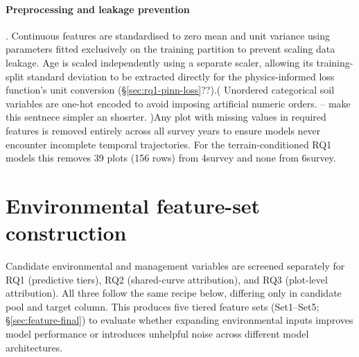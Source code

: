 \documentclass[11pt,a4paper]{report}
\begin{document}
\paragraph*{Preprocessing and leakage prevention}. Continuous features are standardised to zero mean and unit variance using parameters fitted exclusively on the training partition to prevent scaling data leakage. Age is scaled independently using a separate scaler, allowing its training-split standard deviation to be extracted directly for the physics-informed loss function's unit conversion (\S\ref{sec:rq1-pinn-loss}??).( Unordered categorical soil variables are one-hot encoded to avoid imposing artificial numeric orders.  -- make this sentnece simpler an shosrter. )Any plot with missing values in required features is removed entirely across all survey years to ensure models never encounter incomplete temporal trajectories. For the terrain-conditioned RQ1 models this removes 39 plots (156 rows) from 4survey and none from 6survey. 


\section{Environmental feature-set construction}
Candidate environmental and management variables are screened separately for RQ1 (predictive tiers), RQ2 (shared-curve attribution), and RQ3 (plot-level attribution). All three follow the same recipe below, differing only in candidate pool and
target column. This produces five tiered feature sets (Set1–Set5; \S\ref{sec:feature-final}) to evaluate whether expanding environmental inputs improves model performance or introduces unhelpful noise across different model architectures.
\end{document}
